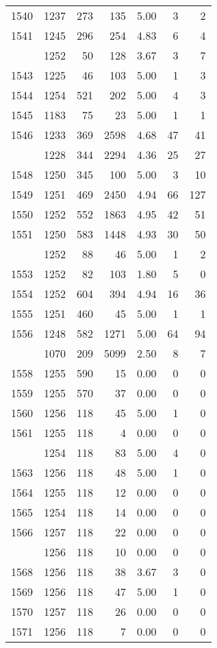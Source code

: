 \documentclass[
]{article}
\begin{document}
\begin{table}
\begin{tabular}[t]{lrrrrrr}
1540 & 1237 & 273 & 135 & 5.00 & 3 & 2\\
1541 & 1245 & 296 & 254 & 4.83 & 6 & 4\\
\addlinespace
1542 & 1252 & 50 & 128 & 3.67 & 3 & 7\\
1543 & 1225 & 46 & 103 & 5.00 & 1 & 3\\
1544 & 1254 & 521 & 202 & 5.00 & 4 & 3\\
1545 & 1183 & 75 & 23 & 5.00 & 1 & 1\\
1546 & 1233 & 369 & 2598 & 4.68 & 47 & 41\\
\addlinespace
1547 & 1228 & 344 & 2294 & 4.36 & 25 & 27\\
1548 & 1250 & 345 & 100 & 5.00 & 3 & 10\\
1549 & 1251 & 469 & 2450 & 4.94 & 66 & 127\\
1550 & 1252 & 552 & 1863 & 4.95 & 42 & 51\\
1551 & 1250 & 583 & 1448 & 4.93 & 30 & 50\\
\addlinespace
1552 & 1252 & 88 & 46 & 5.00 & 1 & 2\\
1553 & 1252 & 82 & 103 & 1.80 & 5 & 0\\
1554 & 1252 & 604 & 394 & 4.94 & 16 & 36\\
1555 & 1251 & 460 & 45 & 5.00 & 1 & 1\\
1556 & 1248 & 582 & 1271 & 5.00 & 64 & 94\\
\addlinespace
1557 & 1070 & 209 & 5099 & 2.50 & 8 & 7\\
1558 & 1255 & 590 & 15 & 0.00 & 0 & 0\\
1559 & 1255 & 570 & 37 & 0.00 & 0 & 0\\
1560 & 1256 & 118 & 45 & 5.00 & 1 & 0\\
1561 & 1255 & 118 & 4 & 0.00 & 0 & 0\\
\addlinespace
1562 & 1254 & 118 & 83 & 5.00 & 4 & 0\\
1563 & 1256 & 118 & 48 & 5.00 & 1 & 0\\
1564 & 1255 & 118 & 12 & 0.00 & 0 & 0\\
1565 & 1254 & 118 & 14 & 0.00 & 0 & 0\\
1566 & 1257 & 118 & 22 & 0.00 & 0 & 0\\
\addlinespace
1567 & 1256 & 118 & 10 & 0.00 & 0 & 0\\
1568 & 1256 & 118 & 38 & 3.67 & 3 & 0\\
1569 & 1256 & 118 & 47 & 5.00 & 1 & 0\\
1570 & 1257 & 118 & 26 & 0.00 & 0 & 0\\
1571 & 1256 & 118 & 7 & 0.00 & 0 & 0\\

\end{tabular}
\end{table}
\end{document}
